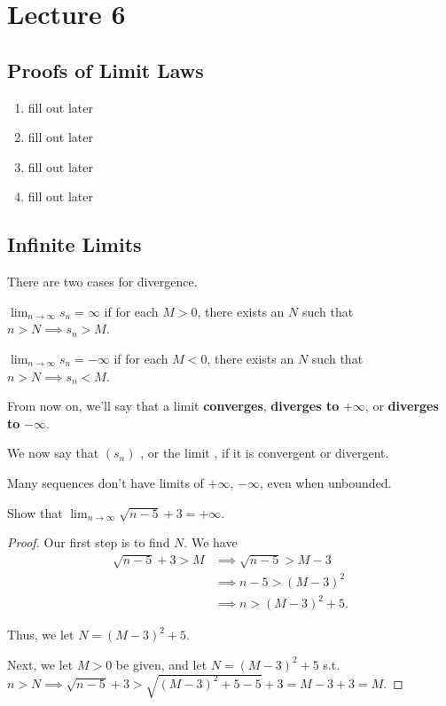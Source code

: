 \documentclass{book}
\begin{document}
\newpage
\section{Lecture 6}
\subsection{Proofs of Limit Laws}
\begin{enumerate}[label = (\alph*)]
    \item fill out later
    \item fill out later 
    \item fill out later 
    \item fill out later 
\end{enumerate}
\subsection{Infinite Limits}
\begin{defn}[Divergence]
    There are two cases for divergence. 

    $\lim_{n \to \infty} s_n = \infty$ if for each $M > 0$, there exists an $N$ such that $n > N \implies s_n > M$.

    $\lim_{n \to \infty} s_n = -\infty$ if for each $M < 0$, there exists an $N$ such that $n > N \implies s_n < M$.

    From now on, we'll say that a limit \textbf{converges}, \textbf{diverges to }$+\infty$, or \textbf{diverges to }$-\infty$.
\end{defn}

We now say that $(s_n)$ , or the limit , if it is convergent or divergent.

\begin{remark}
    Many sequences don't have limits of $+\infty$, $-\infty$, even when unbounded.
\end{remark}

\begin{ex}
    Show that $\lim_{n \to \infty} \sqrt{n - 5} + 3 = +\infty$.
\end{ex}

\begin{proof}
    Our first step is to find $N$. We have 
    \begin{align*}
        \sqrt{n - 5} + 3 > M &\implies \sqrt{n - 5} > M - 3\\
        &\implies n - 5 > (M - 3)^2 \\
        &\implies n > (M - 3)^2 + 5.
    \end{align*}

    Thus, we let $N = (M - 3)^2 + 5.$

    Next, we let $M > 0$ be given, and let $N = (M - 3)^2 + 5$ s.t. $n > N \implies \sqrt{n - 5}+3 > \sqrt{(M - 3)^2 + 5 - 5} + 3 = M-3 + 3 = M$.
\end{proof}
\end{document}

